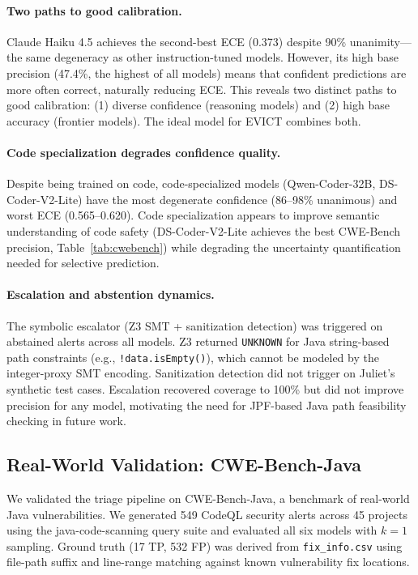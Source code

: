 \paragraph{Two paths to good calibration.}
Claude Haiku 4.5 achieves the second-best ECE (0.373) despite 90\% unanimity---the same degeneracy as other instruction-tuned models. However, its high base precision (47.4\%, the highest of all models) means that confident predictions are more often correct, naturally reducing ECE. This reveals two distinct paths to good calibration: (1) diverse confidence (reasoning models) and (2) high base accuracy (frontier models). The ideal model for EVICT combines both.

\paragraph{Code specialization degrades confidence quality.}
Despite being trained on code, code-specialized models (Qwen-Coder-32B, DS-Coder-V2-Lite) have the most degenerate confidence (86--98\% unanimous) and worst ECE (0.565--0.620). Code specialization appears to improve semantic understanding of code safety (DS-Coder-V2-Lite achieves the best CWE-Bench precision, Table~\ref{tab:cwebench}) while degrading the uncertainty quantification needed for selective prediction.

\paragraph{Escalation and abstention dynamics.}
The symbolic escalator (Z3 SMT + sanitization detection) was triggered on abstained alerts across all models. Z3 returned \texttt{UNKNOWN} for Java string-based path constraints (e.g., \texttt{!data.isEmpty()}), which cannot be modeled by the integer-proxy SMT encoding. Sanitization detection did not trigger on Juliet's synthetic test cases. Escalation recovered coverage to 100\% but did not improve precision for any model, motivating the need for JPF-based Java path feasibility checking in future work.

\subsection{Real-World Validation: CWE-Bench-Java}
\label{sec:cwebench_results}

We validated the triage pipeline on CWE-Bench-Java, a benchmark of real-world Java vulnerabilities. We generated 549 CodeQL security alerts across 45 projects using the java-code-scanning query suite and evaluated all six models with $k=1$ sampling. Ground truth (17 TP, 532 FP) was derived from \texttt{fix\_info.csv} using file-path suffix and line-range matching against known vulnerability fix locations.

